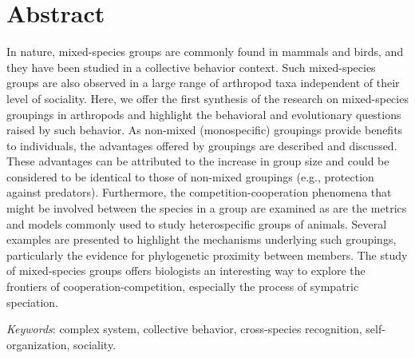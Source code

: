 	\section{Abstract}
In nature, mixed-species groups are commonly found in mammals and birds, and they have been studied in a collective behavior context. Such mixed-species groups are also observed in a large range of arthropod taxa independent of their level of sociality. Here, we offer the first synthesis of the research on mixed-species groupings in arthropods and highlight the behavioral and evolutionary questions raised by such behavior. As non-mixed (monospecific) groupings provide benefits to individuals, the advantages offered by groupings are described and discussed. These advantages can be attributed to the increase in group size and could be considered to be identical to those of non-mixed groupings (e.g., protection against predators). Furthermore, the competition-cooperation phenomena that might be involved between the species in a group are examined as are the metrics and models commonly used to study heterospecific groups of animals. Several examples are presented to highlight the mechanisms underlying such groupings, particularly the evidence for phylogenetic proximity between members. The study of mixed-species groups offers biologists an interesting way to explore the frontiers of cooperation-competition, especially the process of sympatric speciation.

\textit{Keywords}: complex system, collective behavior, cross-species recognition, self-organization, sociality.

\clearpage

